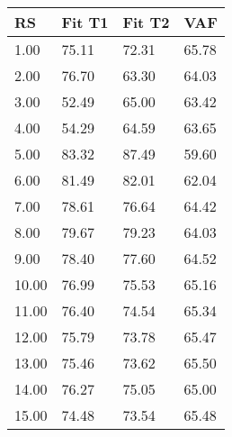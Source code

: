 \begin{tabular}{llll}
RS & Fit T1 & Fit T2 & VAF \\ 
\hline 
 1.00 & 75.11 & 72.31 & 65.78 \\ 
 2.00 & 76.70 & 63.30 & 64.03 \\ 
 3.00 & 52.49 & 65.00 & 63.42 \\ 
 4.00 & 54.29 & 64.59 & 63.65 \\ 
 5.00 & 83.32 & 87.49 & 59.60 \\ 
 6.00 & 81.49 & 82.01 & 62.04 \\ 
 7.00 & 78.61 & 76.64 & 64.42 \\ 
 8.00 & 79.67 & 79.23 & 64.03 \\ 
 9.00 & 78.40 & 77.60 & 64.52 \\ 
10.00 & 76.99 & 75.53 & 65.16 \\ 
11.00 & 76.40 & 74.54 & 65.34 \\ 
12.00 & 75.79 & 73.78 & 65.47 \\ 
13.00 & 75.46 & 73.62 & 65.50 \\ 
14.00 & 76.27 & 75.05 & 65.00 \\ 
15.00 & 74.48 & 73.54 & 65.48 \\ 
\hline 
\end{tabular}